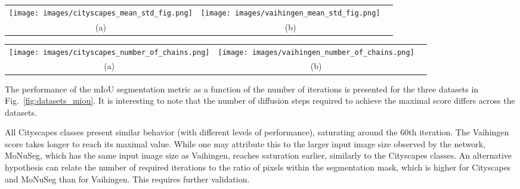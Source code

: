 \documentclass[10pt,twocolumn,letterpaper]{article}
\begin{document}
\begin{figure*}[t]
\centering
\begin{tabular}{@{}c@{~}c@{~}c@{}}
    \texttt{[image: images/cityscapes\_mean\_std\_fig.png]} &  
    \texttt{[image: images/vaihingen\_mean\_std\_fig.png]} 
    \\
    (a) & (b)\\
\end{tabular}
\caption{mIoU (mean and variance) across the test images as a function of the number of diffusion steps. (a) Results for the Cityscapes classes, with $128\times 128$ image resolution. (b) Results for the Vaihingen and MoNuSeg datasets, with $256\times 256$ image resolution.}
\label{fig:datasets_miou}
\end{figure*}

\begin{figure*}[t]
\centering
\begin{tabular}{@{}c@{~}c@{~}c@{}}
    \texttt{[image: images/cityscapes\_number\_of\_chains.png]} &  
    \texttt{[image: images/vaihingen\_number\_of\_chains.png]} 
    \\
    (a) & (b)\\
\end{tabular}
\caption{mIoU per number of generated inferences. (a) Results for the Cityscapes classes, with $128\times 128$ image resolution. (b) Results for the Vaihingen and MoNuSeg datasets, with $256\times 256$ image resolution.}
\label{fig:datasets_miou_for_number_of_generated_instances}
\end{figure*}

The performance of the mIoU segmentation metric as a function of the number of iterations is presented for the three datasets in Fig.~\ref{fig:datasets_miou}. It is interesting to note that the number of diffusion steps required to achieve the maximal score differs across the datasets. 

All Cityscapes classes present similar behavior (with different levels of performance), saturating around the 60th iteration. The Vaihingen score takes longer to reach its maximal value. While one may attribute this to the larger input image size observed by the network, MoNuSeg, which has the same input image size as Vaihingen, reaches saturation earlier, similarly to the Cityscapes classes. An alternative hypothesis can relate the number of required iterations to the ratio of pixels within the segmentation mask, which is higher for Cityscapes and MoNuSeg than for Vaihingen. This requires further validation. 
\end{document}
